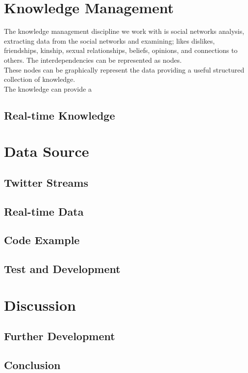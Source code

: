 \documentclass[]{article}  %
\begin{document}
\section{Knowledge Management}
The knowledge management discipline we work with is social networks analysis, extracting data from the social networks and examining; likes dislikes, friendships, kinship, sexual relationships, beliefs, opinions, and connections to others. The interdependencies can be represented as nodes. \\ These nodes can be graphically represent the data providing a useful structured collection of knowledge. \\  The knowledge can provide a 

\subsection{Real-time Knowledge}

\section{Data Source}
\subsection{Twitter Streams}
\subsection{Real-time Data}
\subsection{Code Example}
\subsection{Test and Development}
       
\section{Discussion}
\subsection{Further Development}
\subsection{Conclusion}

\nocite{bib1} 
\nocite{bib2}
\nocite{bib3}
\nocite{bib4}
\nocite{bib5}
\nocite{bib6}
\nocite{bib7}
\nocite{bib8}
\nocite{bib9}
\nocite{bib10}
\nocite{bib11}
\nocite{bib12}




\end{document}
